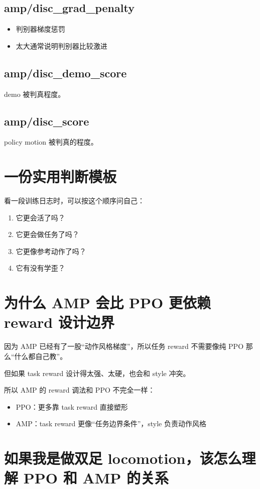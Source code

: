 \documentclass[11pt,a4paper]{article}
\begin{document}
\subsection*{amp/disc\_grad\_penalty}
\begin{itemize}
\item 判别器梯度惩罚
\item 太大通常说明判别器比较激进
\end{itemize}

\subsection*{amp/disc\_demo\_score}
demo 被判真程度。

\subsection*{amp/disc\_score}
policy motion 被判真的程度。

\section{一份实用判断模板}
看一段训练日志时，可以按这个顺序问自己：
\begin{enumerate}
\item 它更会活了吗？
\item 它更会做任务了吗？
\item 它更像参考动作了吗？
\item 它有没有学歪？
\end{enumerate}

\section{为什么 AMP 会比 PPO 更依赖 reward 设计边界}
因为 AMP 已经有了一股“动作风格梯度”，所以任务 reward 不需要像纯 PPO 那么“什么都自己教”。

但如果 task reward 设计得太强、太硬，也会和 style 冲突。

所以 AMP 的 reward 调法和 PPO 不完全一样：
\begin{itemize}
\item PPO：更多靠 task reward 直接塑形
\item AMP：task reward 更像“任务边界条件”，style 负责动作风格
\end{itemize}

\section{如果我是做双足 locomotion，该怎么理解 PPO 和 AMP 的关系}
\end{document}
